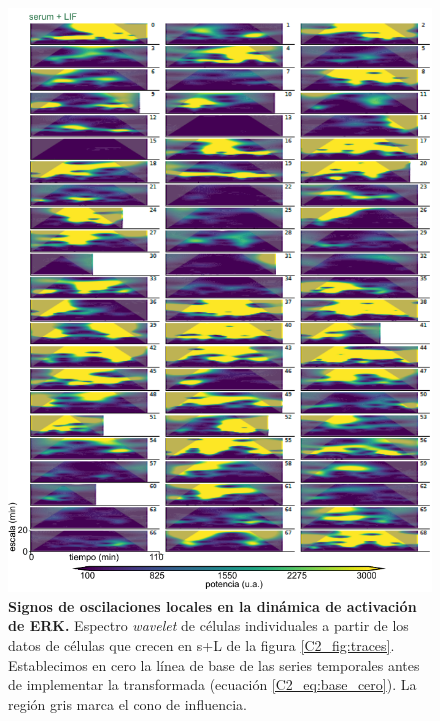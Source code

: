 \documentclass[./main.tex]{subfiles}
\begin{document}
 \begin{figure}
    \centering
    \includegraphics[width=1\columnwidth]{figures/chapter2/C2_wavelets_WT.pdf}\caption{\textbf{Signos de oscilaciones locales en la dinámica de activación de ERK.} Espectro \textit{wavelet} de células individuales a partir de los datos de células que crecen en s+L de la figura \ref{C2_fig:traces}. Establecimos en cero la línea de base de las series temporales antes de implementar la transformada (ecuación \ref{C2_eq:base_cero}). La región gris marca el cono de influencia.}
    \label{C2_fig:wavelets_WT}
\end{figure}
\end{document}
